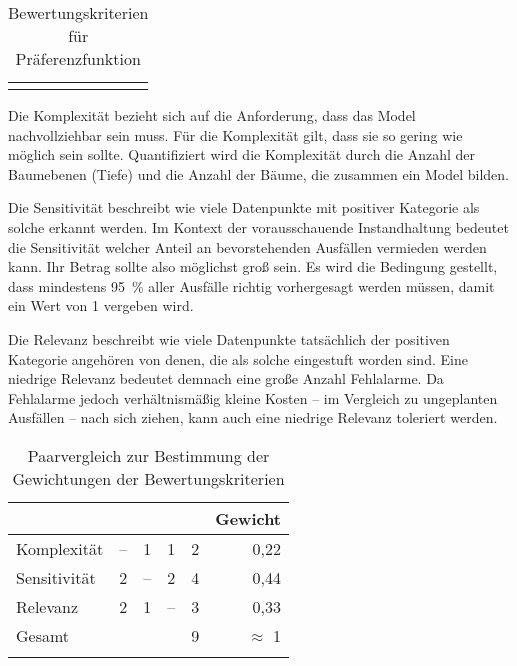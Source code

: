 \begin{table}[ht]
\begin{tabularx}{\textwidth}{|p{2.5cm}|p{2.5cm}|c|X|}
		\hline
		\caption{Bewertungskriterien für Präferenzfunktion}%
		\label{tab:bewertungskriterien_fuer_praeferenzfunktion}	%
	\end{tabularx}
\end{table}

Die Komplexität bezieht sich auf die Anforderung, dass das Model nachvollziehbar sein muss. Für die Komplexität gilt, dass sie so gering wie möglich sein sollte. Quantifiziert wird die Komplexität durch die Anzahl der Baumebenen (Tiefe) und die Anzahl der Bäume, die zusammen ein Model bilden.

Die Sensitivität beschreibt wie viele Datenpunkte mit positiver Kategorie als solche erkannt werden. Im Kontext der vorausschauende Instandhaltung bedeutet die Sensitivität welcher Anteil an bevorstehenden Ausfällen vermieden werden kann. Ihr Betrag sollte also möglichst groß sein. Es wird die Bedingung gestellt, dass mindestens \SI{95}{\percent} aller Ausfälle richtig vorhergesagt werden müssen, damit ein Wert von \num{1} vergeben wird.

Die Relevanz beschreibt wie viele Datenpunkte tatsächlich der positiven Kategorie angehören von denen, die als solche eingestuft worden sind. Eine niedrige Relevanz bedeutet demnach eine große Anzahl Fehlalarme. Da Fehlalarme jedoch verhältnismäßig kleine Kosten -- im Vergleich zu ungeplanten Ausfällen -- nach sich ziehen, kann auch eine niedrige Relevanz toleriert werden.

\begin{table}[h]
	\begin{tabularx}{\textwidth}{|l|ccc|c|r|}
		\hline
		& \rotatebox{90}{Komplexität} & \rotatebox{90}{Sensitivität} & \rotatebox{90}{Relevanz} & \rotatebox{90}{Summe} & Gewicht\\
		\hline
		Komplexität & -- & 1 & 1 & 2 & 0,22\\
		Sensitivität & 2 & -- & 2 & 4 & 0,44\\
		Relevanz & 2 & 1 & -- & 3 & 0,33\\
		\hline
		\hline
		Gesamt & \multicolumn{2}{c}{} & & 9 & $\approx$ 1\\
		\hline
		\caption{Paarvergleich zur Bestimmung der Gewichtungen der Bewertungskriterien}
		\label{tab:paarvergleich}
	\end{tabularx}
\end{table}

